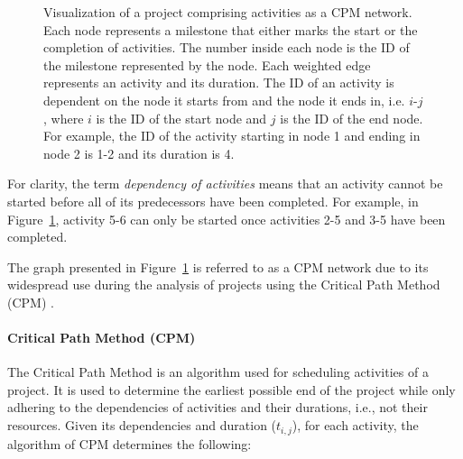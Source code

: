 \begin{figure}[ht!]
	\centering
	\caption{Visualization of a project comprising activities as a CPM network.
		Each node represents a milestone that either marks the start or the completion of activities.
		The number inside each node is the ID of the milestone represented by the node.
		Each weighted edge represents an activity and its duration.
		The ID of an activity is dependent on the node it starts from and the node it ends in, i.e. $i$-$j$, where $i$ is the ID of the start node and $j$ is the ID of the end node.
		For example, the ID of the activity starting in node 1 and ending in node 2 is 1-2 and its duration is 4.
	}
	\label{Figure:theory->problem->cpm-network-example}
\end{figure}

For clarity, the term \textit{dependency of activities} means that an activity cannot be started before all of its predecessors have been completed. For example, in Figure~\ref{Figure:theory->problem->cpm-network-example}, activity 5-6 can only be started once activities 2-5 and 3-5 have been completed.

The graph presented in Figure~\ref{Figure:theory->problem->cpm-network-example} is referred to as a CPM network due to its widespread use during the analysis of projects using the Critical Path Method (CPM) \cite{Kelley1959}.

\paragraph{Critical Path Method (CPM)}
The Critical Path Method is an algorithm used for scheduling activities of a project.
It is used to determine the earliest possible end of the project while only adhering to the dependencies of activities and their durations, i.e., not their resources.
Given its dependencies and duration ($t_{i, j}$), for each activity, the algorithm of CPM determines the following: 

